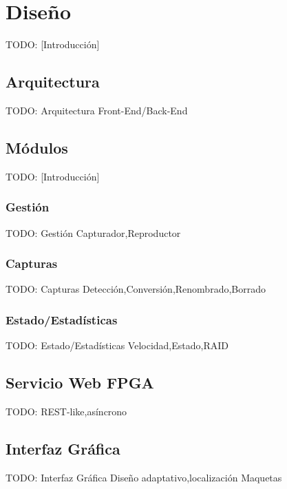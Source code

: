 \chapter{Diseño\label{cap:disenho}}

TODO: [Introducción]


\section{Arquitectura\label{sec:dis:arquitectura}}

TODO: Arquitectura
  {Front-End/Back-End}


\section{Módulos\label{sec:dis:modulos}}

TODO: [Introducción]


\subsection{Gestión\label{ssec:dis:gestion}}

TODO: Gestión
  {Capturador,Reproductor}


\subsection{Capturas\label{ssec:dis:capturas}}

TODO: Capturas
  {Detección,Conversión,Renombrado,Borrado}


\subsection{Estado/Estadísticas\label{ssec:dis:estado_estadisticas}}

TODO: Estado/Estadísticas
  {Velocidad,Estado,RAID}


\section{Servicio Web FPGA\label{sec:dis:servicio_web_fpga}}

TODO: 
  {REST-like,asíncrono}


\section{Interfaz Gráfica\label{sec:dis:interfaz_grafica}}

TODO: Interfaz Gráfica
  {Diseño adaptativo,localización}
  {Maquetas}
  
